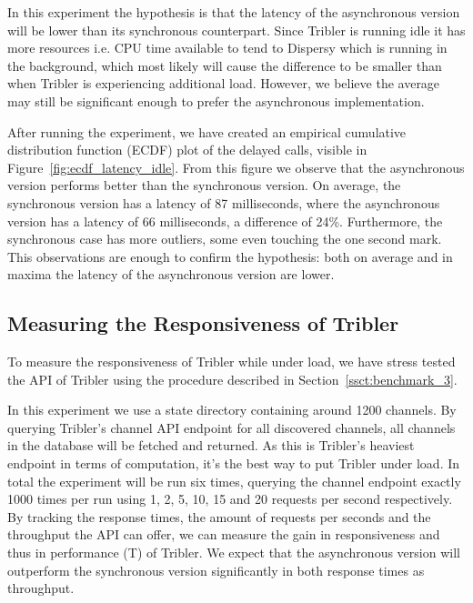 In this experiment the hypothesis is that the latency of the asynchronous version will be lower than its synchronous counterpart.
Since Tribler is running idle it has more resources i.e. CPU time available to tend to Dispersy which is running in the background, which most likely will cause the difference to be smaller than when Tribler is experiencing additional load.
However, we believe the average may still be significant enough to prefer the asynchronous implementation.

After running the experiment, we have created an empirical cumulative distribution function (ECDF) plot of the delayed calls, visible in Figure~\ref{fig:ecdf_latency_idle}.
From this figure we observe that the asynchronous version performs better than the synchronous version.
On average, the synchronous version has a latency of 87 milliseconds, where the asynchronous version has a latency of 66 milliseconds, a difference of 24\%.
Furthermore, the synchronous case has more outliers, some even touching the one second mark.
This observations are enough to confirm the hypothesis: both on average and in maxima the latency of the asynchronous version are lower.

\subsection{Measuring the Responsiveness of Tribler}
\label{sct:measuring_responsiveness_tribler}

To measure the responsiveness of Tribler while under load, we have stress tested the API of Tribler using the procedure described in Section~\ref{ssct:benchmark_3}.

In this experiment we use a state directory containing around 1200 channels.
By querying Tribler's channel API endpoint for all discovered channels, all channels in the database will be fetched and returned.
As this is Tribler's heaviest endpoint in terms of computation, it's the best way to put Tribler under load.
In total the experiment will be run six times, querying the channel endpoint exactly 1000 times per run using 1, 2, 5, 10, 15 and 20 requests per second respectively.
By tracking the response times, the amount of requests per seconds and the throughput the API can offer, we can measure the gain in responsiveness and thus in performance (T) of Tribler.
We expect that the asynchronous version will outperform the synchronous version significantly in both response times as throughput.


